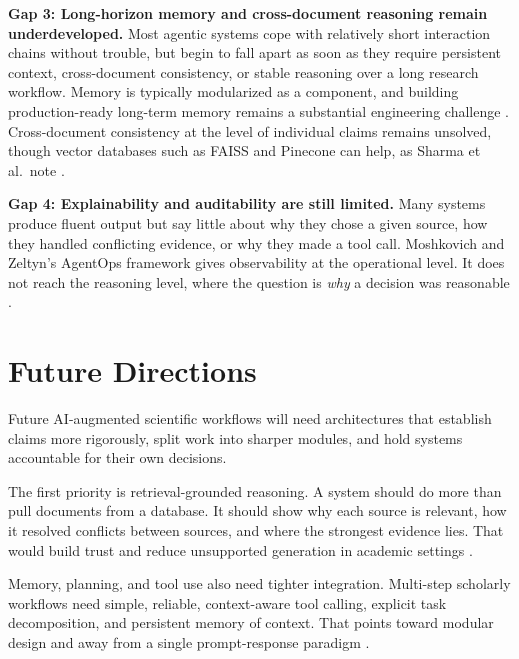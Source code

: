 \documentclass[sn-basic,Numbered]{sn-jnl}
\begin{document}
\textbf{Gap 3: Long-horizon memory and cross-document reasoning remain
underdeveloped.} Most agentic systems cope with relatively short
interaction chains without trouble, but begin to fall apart as soon as
they require persistent context, cross-document consistency, or stable
reasoning over a long research workflow. Memory is typically
modularized as a component, and building production-ready long-term
memory remains a substantial engineering challenge
\cite{chen2025llmagent}. Cross-document consistency at the level of
individual claims remains unsolved, though vector databases such as
FAISS and Pinecone can help, as Sharma et al.\ note
\cite{sharma2025textclassification}.

\textbf{Gap 4: Explainability and auditability are still limited.}
Many systems produce fluent output but say little about why they chose
a given source, how they handled conflicting evidence, or why they made
a tool call. Moshkovich and Zeltyn's AgentOps framework gives
observability at the operational level. It does not reach the reasoning
level, where the question is \emph{why} a decision was reasonable
\cite{moshkovich2025agentops}.

\section{Future Directions}
\label{sec:future}

Future AI-augmented scientific workflows will need architectures that
establish claims more rigorously, split work into sharper modules, and
hold systems accountable for their own decisions.

The first priority is retrieval-grounded reasoning. A system should do
more than pull documents from a database. It should show why each source
is relevant, how it resolved conflicts between sources, and where the
strongest evidence lies. That would build trust and reduce unsupported
generation in academic settings \cite{singh2025agentrag,han2024ragslr}.

Memory, planning, and tool use also need tighter integration.
Multi-step scholarly workflows need simple, reliable, context-aware tool
calling, explicit task decomposition, and persistent memory of context.
That points toward modular design and away from a single prompt-response
paradigm \cite{chen2025llmagent,singh2025tactool}.
\end{document}
